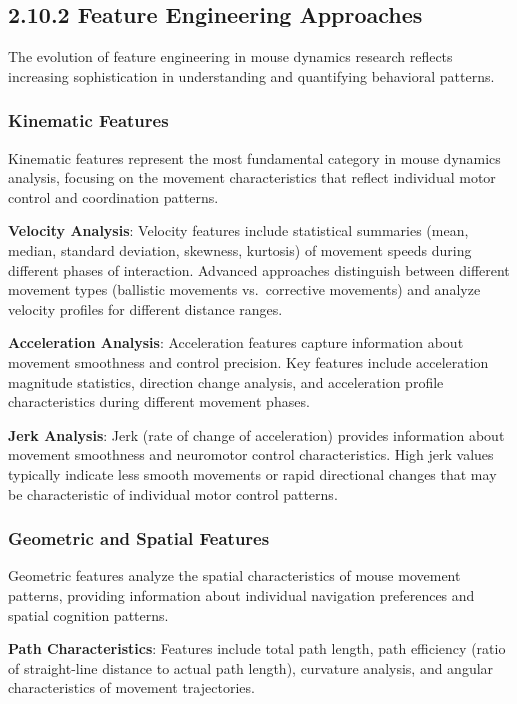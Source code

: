 \documentclass[
  12pt,
  a4paper,
]{report}
\begin{document}
\subsection{2.10.2 Feature Engineering
Approaches}\label{feature-engineering-approaches-1}

The evolution of feature engineering in mouse dynamics research reflects
increasing sophistication in understanding and quantifying behavioral
patterns.

\subsubsection{Kinematic Features}\label{kinematic-features}

Kinematic features represent the most fundamental category in mouse
dynamics analysis, focusing on the movement characteristics that reflect
individual motor control and coordination patterns.

\textbf{Velocity Analysis}: Velocity features include statistical
summaries (mean, median, standard deviation, skewness, kurtosis) of
movement speeds during different phases of interaction. Advanced
approaches distinguish between different movement types (ballistic
movements vs.~corrective movements) and analyze velocity profiles for
different distance ranges.

\textbf{Acceleration Analysis}: Acceleration features capture
information about movement smoothness and control precision. Key
features include acceleration magnitude statistics, direction change
analysis, and acceleration profile characteristics during different
movement phases.

\textbf{Jerk Analysis}: Jerk (rate of change of acceleration) provides
information about movement smoothness and neuromotor control
characteristics. High jerk values typically indicate less smooth
movements or rapid directional changes that may be characteristic of
individual motor control patterns.

\subsubsection{Geometric and Spatial
Features}\label{geometric-and-spatial-features}

Geometric features analyze the spatial characteristics of mouse movement
patterns, providing information about individual navigation preferences
and spatial cognition patterns.

\textbf{Path Characteristics}: Features include total path length, path
efficiency (ratio of straight-line distance to actual path length),
curvature analysis, and angular characteristics of movement
trajectories.
\end{document}
